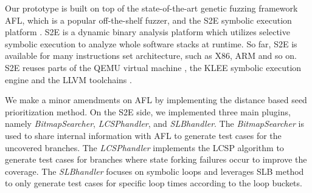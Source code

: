 Our prototype is built on top of the state-of-the-art genetic fuzzing framework AFL, which is a popular off-the-shelf fuzzer, and the S2E symbolic execution platform \cite{chipounov2011s2e}. S2E is a dynamic binary analysis platform which utilizes selective symbolic execution to analyze whole software stacks at runtime. So far, S2E is available for many instructions set architecture, such as X86, ARM and so on. S2E reuses parts of the QEMU virtual machine \cite{bellard2005qemu}, the KLEE symbolic execution engine \cite{cadar2008klee} and the LLVM toolchains \cite{lattner2004llvm}.

We make a minor amendments on AFL by implementing the distance based seed prioritization method. On the S2E side, we implemented three main plugins, namely \textit{BitmapSearcher}, \textit{LCSPhandler}, and \textit{SLBhandler}. The \textit{BitmapSearcher} is used to share internal information with AFL to generate test cases for the uncovered branches. The \textit{LCSPhandler} implements the LCSP algorithm to generate test cases for branches where state forking failures occur to improve the coverage. The \textit{SLBhandler} focuses on symbolic loops and leverages SLB method to only generate test cases for specific loop times according to the loop buckets. 
